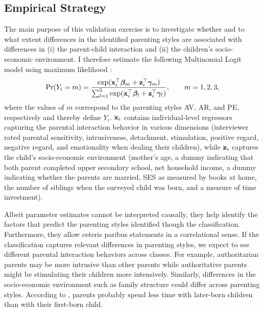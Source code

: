 \subsection{Empirical Strategy}
The main purpose of this validation exercise is to investigate whether and to what extent differences in the identified parenting styles are associated with differences in (i) the parent-child interaction and (ii) the children's socio-economic environment. I therefore estimate the following Multinomial Logit model
using maximum likelihood \parencite[see][chapter 15]{cameronMicroeconometricsMethodsApplications2005}:
\begin{equation}
	\text{Pr}(Y_i = m) = \frac{\exp(\textbf{x}^\top_{i} \bm{\beta}_m + \textbf{z}^\top_{i} \bm{\gamma}_m)}{\sum_{l=1}^{3} \exp(\textbf{x}^\top_{i}\bm{\beta}_l + \textbf{z}^\top_{i} \bm{\gamma}_l)}, \qquad m = 1, 2, 3, \label{eq:multinom}
\end{equation}
where the values of $m$ correspond to the parenting styles AV, AR, and PE, respectively and thereby define $Y_i$. $\textbf{x}_i$ contains individual-level regressors capturing the parental interaction behavior in various dimensions (interviewer rated parental sensitivity, intrusiveness, detachment, stimulation, positive regard, negative regard, and emotionality when dealing their children), while $\textbf{z}_i$ captures the child's socio-economic environment (mother's age, a dummy indicating that both parent completed upper secondary school, net household income, a dummy indicating whether the parents are married, SES as measured by books at home, the number of siblings when the surveyed child was born, and a measure of time investment).

Albeit parameter estimates cannot be interpreted causally, they help identify the factors that predict the parenting styles identified though the classification. Furthermore, they allow ceteris paribus statements in a correlational sense. If the classification captures relevant differences in parenting styles, we expect to see different parental interaction behaviors across classes. For example, authoritarian parents may be more intrusive than other parents while authoritative parents might be stimulating their children more intensively. Similarly, differences in the socio-economic environment such as family structure could differ across parenting styles. According to \textcite{beckerTreatiseFamily1981}, parents probably spend less time with later-born children than with their first-born child.  

